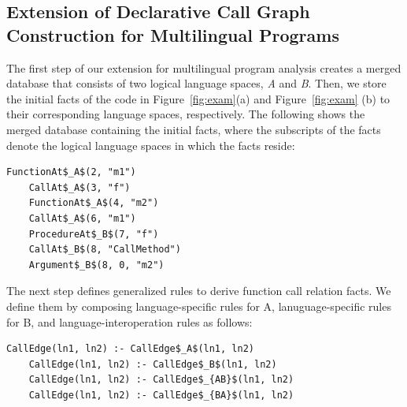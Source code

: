 %


\subsection{Extension of Declarative Call Graph Construction for Multilingual Programs}


The first step of our extension for multilingual program analysis creates a
merged database that consists of two logical language spaces, {\it A} and {\it
B}. Then, we store the initial facts of the code in Figure~\ref{fig:exam}(a) and
Figure~\ref{fig:exam} (b) to
their corresponding language spaces, respectively. The following shows the merged
database containing the initial facts, where the subscripts of the facts denote
the logical language spaces in which the facts reside: 

\begin{lstlisting}[style=mrule]
    FunctionAt$_A$(2, "m1")
    CallAt$_A$(3, "f")
    FunctionAt$_A$(4, "m2")
    CallAt$_A$(6, "m1")
    ProcedureAt$_B$(7, "f")
    CallAt$_B$(8, "CallMethod")
    Argument$_B$(8, 0, "m2")
\end{lstlisting}


The next step defines generalized rules to derive function call relation
facts. We define them by composing language-specific rules for A,
lanuguage-specific rules for B, and language-interoperation rules as follows:

\begin{lstlisting}[style=mrule]
    CallEdge(ln1, ln2) :- CallEdge$_A$(ln1, ln2)
    CallEdge(ln1, ln2) :- CallEdge$_B$(ln1, ln2)
    CallEdge(ln1, ln2) :- CallEdge$_{AB}$(ln1, ln2)
    CallEdge(ln1, ln2) :- CallEdge$_{BA}$(ln1, ln2)
\end{lstlisting}

